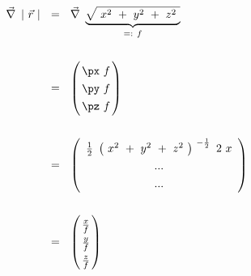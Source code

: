 \begin{align*}
	\vec{\nabla} ~ \left| ~ \vec{r} ~ \right| ~~ &= ~~ \vec{\nabla} ~ \underbrace{ \sqrt{ ~ x^2 ~ + ~ y^2 ~ + ~ z^2 ~ } }_{=: ~ f} \\ \\
	&= ~~ \left( \arraycolsep=1.4pt\def\arraystretch{1.3}\begin{array}{c} \px ~ f \\ \py ~ f \\ \pz ~ f \end{array} \right) \\ \\
	&= ~~ \left( \begin{array}{c} \frac{1}{2} ~ \left( ~ x^2 ~ + ~ y^2 ~ + ~ z^2 ~ \right)^{ ~ -\frac{1}{2}} ~ 2 ~ x \\ ... \\ ... \end{array} \right) \\ \\
	&= ~~ \left( \arraycolsep=1.4pt\def\arraystretch{1.3}\begin{array}{c} \frac{x}{f} \\ \frac{y}{f} \\ \frac{z}{f} \end{array} \right)
\end{align*}

%
%
%
%
%




